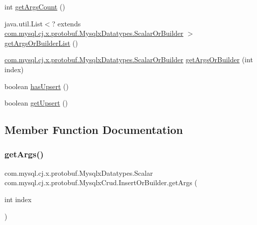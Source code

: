 \begin{DoxyCompactItemize}
int \mbox{\hyperlink{interfacecom_1_1mysql_1_1cj_1_1x_1_1protobuf_1_1_mysqlx_crud_1_1_insert_or_builder_af8b91775a6da9af29072a4483c05fd85}{get\+Args\+Count}} ()
\item 
java.\+util.\+List$<$? extends \mbox{\hyperlink{interfacecom_1_1mysql_1_1cj_1_1x_1_1protobuf_1_1_mysqlx_datatypes_1_1_scalar_or_builder}{com.\+mysql.\+cj.\+x.\+protobuf.\+Mysqlx\+Datatypes.\+Scalar\+Or\+Builder}} $>$ \mbox{\hyperlink{interfacecom_1_1mysql_1_1cj_1_1x_1_1protobuf_1_1_mysqlx_crud_1_1_insert_or_builder_a880b05ca277afc8709ec5ed24acd2479}{get\+Args\+Or\+Builder\+List}} ()
\item 
\mbox{\hyperlink{interfacecom_1_1mysql_1_1cj_1_1x_1_1protobuf_1_1_mysqlx_datatypes_1_1_scalar_or_builder}{com.\+mysql.\+cj.\+x.\+protobuf.\+Mysqlx\+Datatypes.\+Scalar\+Or\+Builder}} \mbox{\hyperlink{interfacecom_1_1mysql_1_1cj_1_1x_1_1protobuf_1_1_mysqlx_crud_1_1_insert_or_builder_a5ef4a87e8f38e70eacf298d3034b0b68}{get\+Args\+Or\+Builder}} (int index)
\item 
boolean \mbox{\hyperlink{interfacecom_1_1mysql_1_1cj_1_1x_1_1protobuf_1_1_mysqlx_crud_1_1_insert_or_builder_a5558110d233d20c698cb759e135490b6}{has\+Upsert}} ()
\item 
boolean \mbox{\hyperlink{interfacecom_1_1mysql_1_1cj_1_1x_1_1protobuf_1_1_mysqlx_crud_1_1_insert_or_builder_a07941c41d1db4ce5ab2d27b1d680abe8}{get\+Upsert}} ()
\end{DoxyCompactItemize}


\subsection{Member Function Documentation}
\mbox{\label{interfacecom_1_1mysql_1_1cj_1_1x_1_1protobuf_1_1_mysqlx_crud_1_1_insert_or_builder_a6c4922d9ab361ae3de5486858c55e5fb}} 
\subsubsection{\texorpdfstring{get\+Args()}{getArgs()}}
{\footnotesize\ttfamily com.\+mysql.\+cj.\+x.\+protobuf.\+Mysqlx\+Datatypes.\+Scalar com.\+mysql.\+cj.\+x.\+protobuf.\+Mysqlx\+Crud.\+Insert\+Or\+Builder.\+get\+Args (\begin{DoxyParamCaption}\item[{int}]{index }\end{DoxyParamCaption})}

